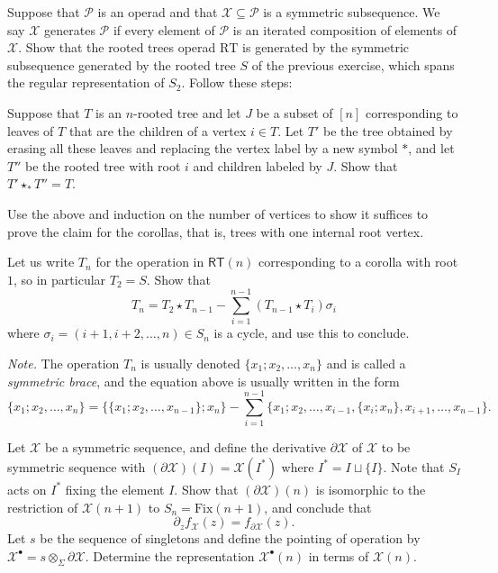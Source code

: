 \begin{question}
Suppose that $\mathcal P$ is an operad
and that $\mathcal X\subseteq \mathcal P$
is a symmetric subsequence. We say
$\mathcal X$ generates $\mathcal P$
if every element of $\mathcal P$ is
an iterated composition of elements of
$\mathcal X$. 
Show that the rooted trees operad 
$\mathrm{RT}$ 
is generated by the symmetric subsequence
generated by the rooted tree $S$ of the
previous exercise, which spans
the regular representation of
$S_2$. Follow these steps:
\end{question}
\begin{tenumerate}
\item Suppose that $T$ is an $n$-rooted tree
and let $J$ be a subset of $[n]$ corresponding
to leaves of $T$ that are the children of a
vertex $i\in T$. Let $T'$ be the
tree obtained by erasing all these leaves
and replacing the vertex label by a new
symbol $\ast$, and let $T''$ be the rooted
tree with root $i$ and children labeled
by $J$. Show that $T'\star_\ast T'' = T$.
\item Use the above and induction on the
number of vertices to show it suffices to prove
the claim for the corollas, that is, trees with
one internal root vertex.
\item Let us write $T_n$
for the operation in $\mathsf{RT}(n)$
corresponding to a corolla with root $1$,
so in particular $T_2 = S$.
Show that 
\[ 
T_n = 
 T_2\star T_{n-1} - 
  	\sum_{i=1}^{n-1} (T_{n-1}\star T_i)\sigma_i
\]
where $\sigma_i = (i+1,i+2,\ldots,n)\in S_n$
is a cycle, and use this to conclude.
\end{tenumerate}

\emph{Note.} The operation $T_n$ is usually
denoted $\{x_1; x_2,\ldots,x_n\}$ and is called
a \emph{symmetric brace}, and the equation
above is usually written in the form
\[ 
\{x_1; x_2,\ldots,x_n\} = 
 \{\{x_1; x_2,\ldots,x_{n-1}\}; x_n\}
 - \sum_{i=1}^{n-1} \{ x_1; x_2,
 \ldots, x_{i-1}, \{x_i ; x_n \},
 x_{i+1},\ldots,x_{n-1}\}.
 \]
 
 \begin{question}
 Let $\mathcal X$ be a symmetric sequence,
 and define the derivative $\partial\mathcal X$ 
 of $\mathcal X$ to be symmetric sequence
 with $(\partial\mathcal X)(I) = \mathcal X(I^*)$
 where $I^* = I \sqcup \{ I \}$. Note that
 $S_I$ acts on $I^*$ fixing the element $I$.
 Show that $(\partial \mathcal X)(n)$ 
 is isomorphic to the restriction of $\mathcal{X}(n+1)$ to $S_n = \mathrm{Fix}(n+1)$, and
 conclude that 
 \[ \partial_z f_{\mathcal X}(z) = 
  			f_{\partial\mathcal X}(z). \]	
  Let $s$ be the sequence of singletons and
  define the pointing of operation by
  $\mathcal X^\bullet = s\otimes_\Sigma \partial   \mathcal{X}$. Determine the representation
  $\mathcal{X}^\bullet(n)$ in terms of
  $\mathcal{X}(n)$. 
 \end{question}
